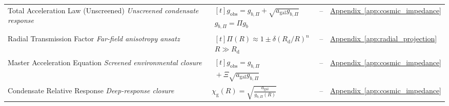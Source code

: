 \begin{longtable}{@{} p{4.5cm} p{6cm} c p{4cm} @{}}
{\raggedright Total Acceleration Law (Unscreened) \newline \textit{Unscreened condensate response}\par} & {\raggedright $\begin{gathered}[t]g_{\mathrm{obs}}=g_{b,\Pi}+\sqrt{a_{\mathrm{gal}}g_{b,\Pi}} \\ g_{b,\Pi}=\Pi g_b\end{gathered}$\par} & -- & {\raggedright \hyperref[app:cosmic_impedance]{Appendix~\ref*{app:cosmic_impedance}}\par} \\

{\raggedright Radial Transmission Factor \newline \textit{Far-field anisotropy ansatz}\par} & {\raggedright $\begin{gathered}[t]\Pi(R)\approx1\pm\delta(R_{\mathrm d}/R)^n \\ R\gg R_{\mathrm d}\end{gathered}$\par} & -- & {\raggedright \hyperref[app:radial_projection]{Appendix~\ref*{app:radial_projection}}\par} \\

{\raggedright Master Acceleration Equation \newline \textit{Screened environmental closure}\par} & {\raggedright $\begin{gathered}[t]g_{\mathrm{obs}}=g_{b,\Pi} \\ {}+\Xi\sqrt{a_{\mathrm{gal}}g_{b,\Pi}}\end{gathered}$\par} & -- & {\raggedright \hyperref[app:cosmic_impedance]{Appendix~\ref*{app:cosmic_impedance}}\par} \\

{\raggedright Condensate Relative Response \newline \textit{Deep-response closure}\par} & {\raggedright $\chi_{\mathrm{g}}(R) = \sqrt{ \frac{a_{\mathrm{gal}}}{g_{b,\Pi}(R)} }$\par} & -- & {\raggedright \hyperref[app:cosmic_impedance]{Appendix~\ref*{app:cosmic_impedance}}\par} \\


\end{longtable}

